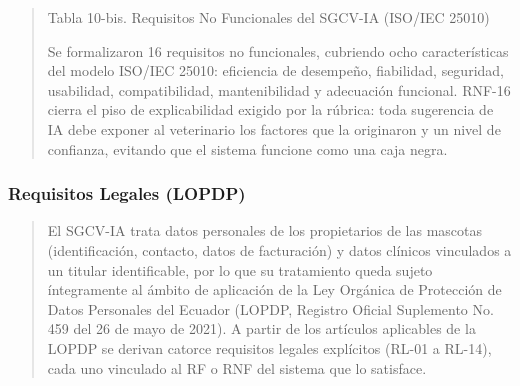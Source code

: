 \begin{quote}
\protect{}\label{_bookmark41b}{}Tabla 10-bis. Requisitos No
Funcionales del SGCV-IA (ISO/IEC 25010)

Se formalizaron 16 requisitos no funcionales, cubriendo ocho
características del modelo ISO/IEC 25010: eficiencia de desempeño,
fiabilidad, seguridad, usabilidad, compatibilidad, mantenibilidad y
adecuación funcional. RNF-16 cierra el piso de explicabilidad exigido
por la rúbrica: toda sugerencia de IA debe exponer al veterinario los
factores que la originaron y un nivel de confianza, evitando que el
sistema funcione como una caja negra.
\end{quote}

\subsubsection{Requisitos Legales
(LOPDP)}\label{requisitos-legales-lopdp}

\begin{quote}
El SGCV-IA trata datos personales de los propietarios de las mascotas
(identificación, contacto, datos de facturación) y datos clínicos
vinculados a un titular identificable, por lo que su tratamiento queda
sujeto íntegramente al ámbito de aplicación de la Ley Orgánica de
Protección de Datos Personales del Ecuador (LOPDP, Registro Oficial
Suplemento No. 459 del 26 de mayo de 2021). A partir de los artículos
aplicables de la LOPDP se derivan catorce requisitos legales explícitos
(RL-01 a RL-14), cada uno vinculado al RF o RNF del sistema que lo
satisface.
\end{quote}

